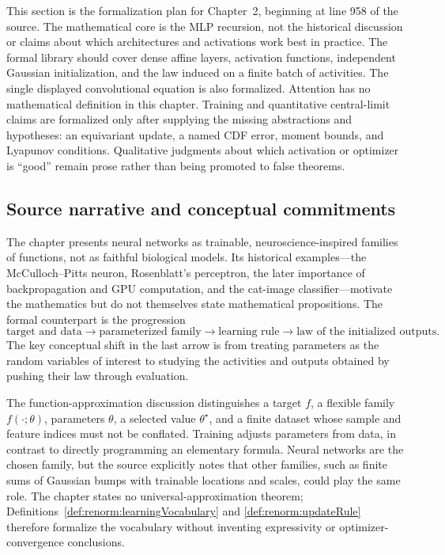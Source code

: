 This section is the formalization plan for Chapter~2, beginning at line 958 of the source.  The
mathematical core is the MLP recursion, not the historical discussion or claims about which
architectures and activations work best in practice.  The formal library should cover dense affine
layers, activation functions, independent Gaussian initialization, and the law induced on a finite
batch of activities.  The single displayed convolutional equation is also formalized.  Attention
has no mathematical definition in this chapter.  Training and quantitative central-limit claims
are formalized only after supplying the missing abstractions and hypotheses: an equivariant update,
a named CDF error, moment bounds, and Lyapunov conditions.  Qualitative judgments about which
activation or optimizer is ``good'' remain prose rather than being promoted to false theorems.

\subsection{Source narrative and conceptual commitments}

The chapter presents neural networks as trainable, neuroscience-inspired families of functions,
not as faithful biological models.  Its historical examples---the McCulloch--Pitts neuron,
Rosenblatt's perceptron, the later importance of backpropagation and GPU computation, and the
cat-image classifier---motivate the mathematics but do not themselves state mathematical
propositions.  The formal counterpart is the progression
\[
  \text{target and data}\longrightarrow
  \text{parameterized family}\longrightarrow
  \text{learning rule}\longrightarrow
  \text{law of the initialized outputs}.
\]
The key conceptual shift in the last arrow is from treating parameters as the random variables of
interest to studying the activities and outputs obtained by pushing their law through evaluation.

The function-approximation discussion distinguishes a target $f$, a flexible family
$f(\mathord\cdot;\theta)$, parameters $\theta$, a selected value $\theta^\star$, and a finite
dataset whose sample and feature indices must not be conflated.  Training adjusts parameters from
data, in contrast to directly programming an elementary formula.  Neural networks are the chosen
family, but the source explicitly notes that other families, such as finite sums of Gaussian
bumps with trainable locations and scales, could play the same role.  The chapter states no
universal-approximation theorem; Definitions~\ref{def:renorm:learningVocabulary} and
\ref{def:renorm:updateRule} therefore formalize the vocabulary without inventing expressivity or
optimizer-convergence conclusions.

